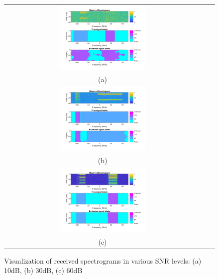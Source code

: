 \documentclass[journal]{IEEEtran} %
\begin{document}
\begin{figure}[h]
    \centering
    \footnotesize
    \begin{tabular}{ccc}
        \includegraphics[width=0.45\textwidth]{img/Visualization_10dB.jpg} & \\(a)\\  \includegraphics[width=0.45\textwidth]{img/Visualization_30dB.jpg} & \\(b)\\ 
        \includegraphics[width=0.45\textwidth]{img/Visualization_60dB.jpg} & \\(c)\\ 
    \end{tabular}
    \caption{Visualization of received spectrograms in various SNR levels: (a) 10dB, (b) 30dB, (c) 60dB}
    \label{fig7}
\end{figure}
\end{document}
